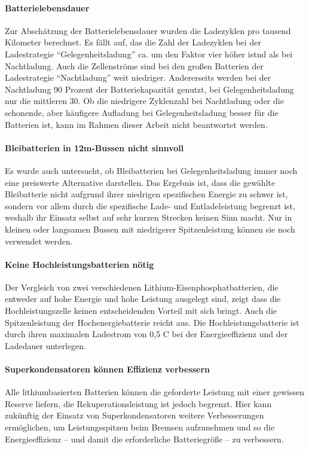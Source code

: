 \paragraph{Batterielebensdauer} Zur Abschätzung der Batterielebensdauer wurden die Ladezyklen pro tausend Kilometer berechnet. Es fällt auf, das die Zahl der Ladezyklen bei der Ladestrategie "`Gelegenheitsladung"' ca. um den Faktor vier höher istnd als bei Nachtladung. Auch die Zellenströme sind bei den großen Batterien der Ladestrategie "`Nachtladung"' weit niedriger. Andererseits werden bei der Nachtladung 90 Prozent der Batteriekapazität genutzt, bei Gelegenheitsladung nur die mittleren 30. Ob die niedrigere Zyklenzahl bei Nachtladung oder die schonende, aber häufigere Aufladung bei Gelegenheitsladung besser für die Batterien ist, kann im Rahmen dieser Arbeit nicht beantwortet werden.

\paragraph{Bleibatterien in 12m-Bussen nicht sinnvoll} Es wurde auch untersucht, ob Bleibatterien bei Gelegenheitsladung immer noch eine preiswerte Alternative darstellen. Das Ergebnis ist, dass die gewählte Bleibatterie nicht aufgrund ihrer niedrigen spezifischen Energie zu schwer ist, sondern vor allem durch die spezifische Lade- und Entladeleistung begrenzt ist, weshalb ihr Einsatz selbst auf sehr kurzen Strecken keinen Sinn macht. Nur in kleinen oder langsamen Bussen mit niedrigerer Spitzenleistung können sie noch verwendet werden.

\paragraph{Keine Hochleistungsbatterien nötig} Der Vergleich von zwei verschiedenen Lithium-Eisenphosphatbatterien, die entweder auf hohe Energie und hohe Leistung ausgelegt sind, zeigt dass die Hochleistungszelle keinen entscheidenden Vorteil mit sich bringt. Auch die Spitzenleistung der Hochenergiebatterie reicht aus. Die Hochleistungsbatterie ist durch ihren maximalen Ladestrom von 0,5 C bei  der Energieeffizienz und der Ladedauer unterlegen.

\paragraph{Superkondensatoren können Effizienz verbessern} Alle lithiumbasierten Batterien können die geforderte Leistung mit einer gewissen Reserve liefern, die Rekuperationsleistung ist jedoch begrenzt. Hier kann zukünftig der Einsatz von Superkondensatoren weitere Verbesserungen ermöglichen, um Leistungsspitzen beim Bremsen aufzunehmen und so die Energieeffizienz – und damit die erforderliche Batteriegröße – zu verbessern.

